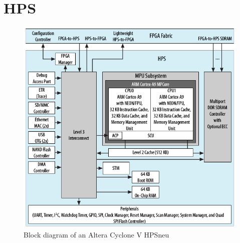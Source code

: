 \section{HPS}
\begin{figure}[htbp]
\begin{center}
\includegraphics[width=15cm,keepaspectratio=true]{bilder/png/AlteraHPSneu}
\caption{Block diagram of an Altera Cyclone V HPSneu\cite{altcycvov15}}
\label{fig:alterahpsblocksneu}
\end{center}
\end{figure}
